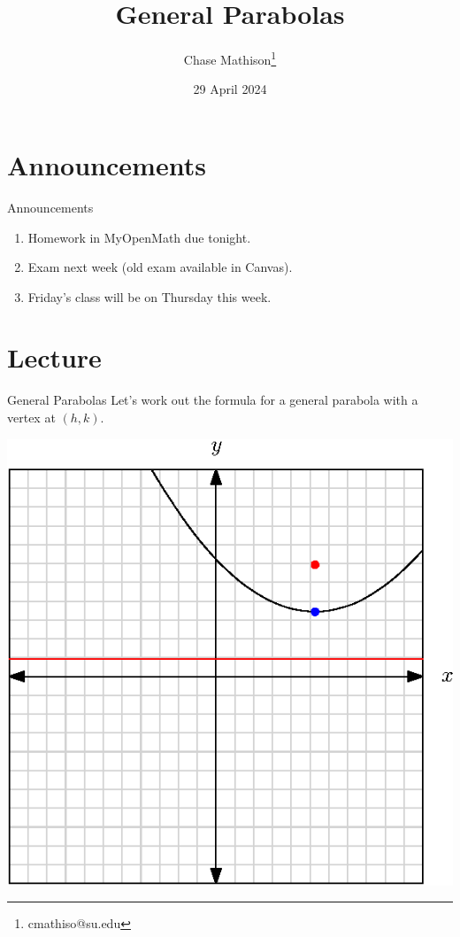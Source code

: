 \documentclass[presentation]{beamer}
\institute[SU]{Shenandoah University}
\author{Chase Mathison\thanks{cmathiso@su.edu}}
\date{29 April 2024}
\title{General Parabolas}
\begin{document}
\maketitle

\section{Announcements}
\label{sec:org8d019ab}
\begin{frame}[label={sec:org16d2903}]{Announcements}
\begin{enumerate}
\item Homework in MyOpenMath due tonight.
\item Exam next week (old exam available in Canvas).
\item Friday's class will be on Thursday this week.
\end{enumerate}
\end{frame}

\section{Lecture}
\label{sec:org46c1550}
\begin{frame}[label={sec:org9629b74}]{General Parabolas}
Let's work out the formula for a general parabola with a vertex at \((h,k)\).

\includegraphics{./general_parabola}
\end{frame}
\end{document}
